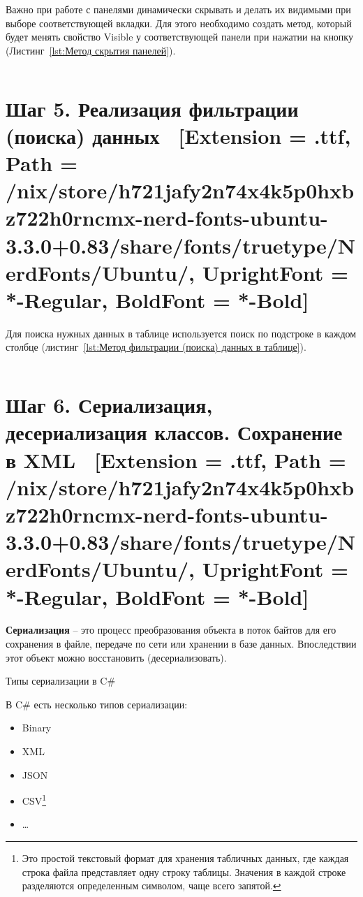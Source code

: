 \documentclass[12pt]{article}
\newcommand{\icon}[1]{\fontspec{UbuntuNerdFont}[Extension = .ttf,
  Path = /nix/store/h721jafy2n74x4k5p0hxbz722h0rncmx-nerd-fonts-ubuntu-3.3.0+0.83/share/fonts/truetype/NerdFonts/Ubuntu/,
  UprightFont = *-Regular,
BoldFont = *-Bold] #1}
\newcommand{\iicon}[1]{{\icon{#1}}}
\newcommand{\colorGIT}[1]{\textcolor{CtpLavender}{#1}}
\renewcommand{\texttt}[1]{{\small\ttfamily #1}}
\newenvironment{code}{\captionsetup{type=listing}}{}
\numberwithin{listing}{section}
\numberwithin{figure}{section}
\begin{document}
Важно при работе с панелями динамически скрывать и делать их видимыми при выборе соответствующей вкладки. Для этого необходимо создать метод, который будет менять свойство \texttt{Visible} у соответствующей панели при нажатии на кнопку (Листинг~\ref{lst:Метод скрытия панелей}).

\begin{code}
	\inputminted[firstline = 100, lastline=131]{csharp}{../../2lab/WinFormsApp1example_/Form1.cs}
	\caption{\colorGIT{\href{https://github.com/WebMasterIT/Csharp_Labs/blob/c79e983c4cab3c416e44b6d5f9854b292fdeae26/2lab/WinFormsApp1example_/Form1.cs\#L100-L131}{Метод}} скрытия панелей}
	\label{lst:Метод скрытия панелей}
\end{code}

\newpage

\section{Шаг 5. Реализация фильтрации (поиска) данных \ \texorpdfstring{{\small{\iicon{}}}}{}}
Для поиска нужных данных в таблице используется поиск по подстроке в каждом столбце (листинг~\ref{lst:Метод фильтрации (поиска) данных в таблице}).

\begin{code}
	\inputminted[firstline = 280, lastline=341, fontsize={\fontsize{8}{8.4}}]{csharp}{../../2lab/WinFormsApp1example_/Form1.cs}
	\caption{\colorGIT{\href{https://github.com/WebMasterIT/Csharp_Labs/blob/c79e983c4cab3c416e44b6d5f9854b292fdeae26/2lab/WinFormsApp1example_/Form1.cs\#L280-L341}{Метод}} фильтрации (поиска) данных в таблице}
	\label{lst:Метод фильтрации (поиска) данных в таблице}
\end{code}

\newpage

\section{Шаг 6. Сериализация, десериализация классов. Сохранение в XML \ \texorpdfstring{{\small{\iicon{}}}}{}}

\textbf{Сериализация} -- это процесс преобразования объекта в поток байтов для его сохранения в файле, передаче по сети или хранении в базе данных. Впоследствии этот объект можно восстановить (десериализовать).

Типы сериализации в \texttt{C\#}

В \texttt{C\#} есть несколько типов сериализации:
\begin{itemize}
	\item \texttt{Binary}
	\item \texttt{XML}
	\item \texttt{JSON}
	\item \texttt{CSV}\footnote{Это простой текстовый формат для хранения табличных данных, где каждая строка файла представляет одну строку таблицы. Значения в каждой строке разделяются определенным символом, чаще всего запятой.}
	\item \ldots
\end{itemize}
\end{document}
